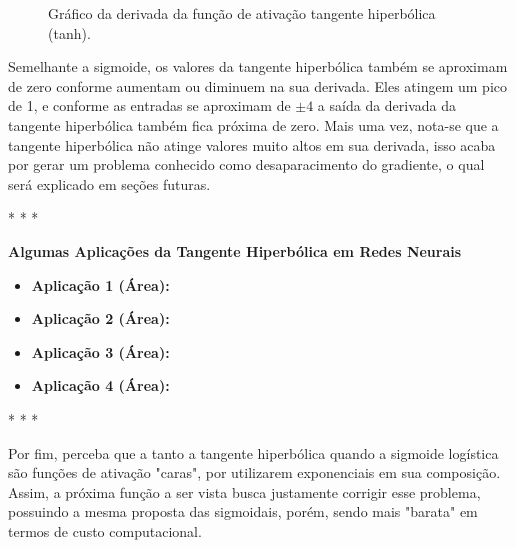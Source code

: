 \begin{figure}[h!]
    \centering
    \caption{Gráfico da derivada da função de ativação tangente hiperbólica (tanh).}
    \label{fig:tanh-derivada}
\end{figure}

Semelhante a sigmoide, os valores da tangente hiperbólica também se aproximam de zero conforme aumentam ou diminuem na sua derivada. Eles atingem um pico de 1, e conforme as entradas se aproximam de $\pm 4$ a saída da derivada da tangente hiperbólica também fica próxima de zero. Mais uma vez, nota-se que a tangente hiperbólica não atinge valores muito altos em sua derivada, isso acaba por gerar um problema conhecido como desaparacimento do gradiente, o qual será explicado em seções futuras.

\medskip
\begin{center}
 * * *
\end{center}
\medskip

\textbf{Algumas Aplicações da Tangente Hiperbólica em Redes Neurais}
\vspace{1em}

\begin{itemize}
    \item \textbf{Aplicação 1 (Área):}
    \item \textbf{Aplicação 2 (Área):}
    \item \textbf{Aplicação 3 (Área):}
    \item \textbf{Aplicação 4 (Área):}
\end{itemize}

\medskip
\begin{center}
 * * *
\end{center}
\medskip

Por fim, perceba que a tanto a tangente hiperbólica quando a sigmoide logística são funções de ativação "caras", por utilizarem exponenciais em sua composição. Assim, a próxima função a ser vista busca justamente corrigir esse problema, possuindo a mesma proposta das sigmoidais, porém, sendo mais "barata" em termos de custo computacional.

